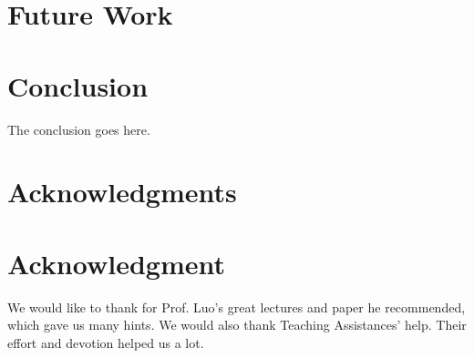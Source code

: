 \documentclass[conference,compsoc]{IEEEtran}
\begin{document}
\section{Future Work}



\section{Conclusion}
The conclusion goes here.







\ifCLASSOPTIONcompsoc
  \section*{Acknowledgments}
\else
  \section*{Acknowledgment}
\fi


We would like to thank for Prof. Luo's great lectures and paper he recommended, 
which gave us many hints.
We would also thank Teaching Assistances' help. Their effort and devotion helped us a lot.







  



\end{document}
